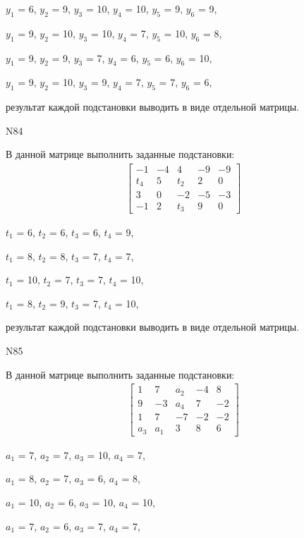 \documentclass[11pt]{report}
\begin{document}
$y_{1}$ = 6, $y_{2}$ = 9, $y_{3}$ = 10, $y_{4}$ = 10, $y_{5}$ = 9, $y_{6}$ = 9, 

$y_{1}$ = 9, $y_{2}$ = 10, $y_{3}$ = 10, $y_{4}$ = 7, $y_{5}$ = 10, $y_{6}$ = 8, 

$y_{1}$ = 9, $y_{2}$ = 9, $y_{3}$ = 7, $y_{4}$ = 6, $y_{5}$ = 6, $y_{6}$ = 10, 

$y_{1}$ = 9, $y_{2}$ = 10, $y_{3}$ = 9, $y_{4}$ = 7, $y_{5}$ = 7, $y_{6}$ = 6, 

результат каждой подстановки выводить в виде отдельной матрицы.

N84

В данной матрице выполнить заданные подстановки:
\begin{align*}
\left[\begin{matrix}-1 & -4 & 4 & -9 & -9\\t_{4} & 5 & t_{2} & 2 & 0\\3 & 0 & -2 & -5 & -3\\-1 & 2 & t_{3} & 9 & 0\end{matrix}\right]
\end{align*}


$t_{1}$ = 6, $t_{2}$ = 6, $t_{3}$ = 6, $t_{4}$ = 9, 

$t_{1}$ = 8, $t_{2}$ = 8, $t_{3}$ = 7, $t_{4}$ = 7, 

$t_{1}$ = 10, $t_{2}$ = 7, $t_{3}$ = 7, $t_{4}$ = 10, 

$t_{1}$ = 8, $t_{2}$ = 9, $t_{3}$ = 7, $t_{4}$ = 10, 

результат каждой подстановки выводить в виде отдельной матрицы.

N85

В данной матрице выполнить заданные подстановки:
\begin{align*}
\left[\begin{matrix}1 & 7 & a_{2} & -4 & 8\\9 & -3 & a_{4} & 7 & -2\\1 & 7 & -7 & -2 & -2\\a_{3} & a_{1} & 3 & 8 & 6\end{matrix}\right]
\end{align*}


$a_{1}$ = 7, $a_{2}$ = 7, $a_{3}$ = 10, $a_{4}$ = 7, 

$a_{1}$ = 8, $a_{2}$ = 7, $a_{3}$ = 6, $a_{4}$ = 8, 

$a_{1}$ = 10, $a_{2}$ = 6, $a_{3}$ = 10, $a_{4}$ = 10, 

$a_{1}$ = 7, $a_{2}$ = 6, $a_{3}$ = 7, $a_{4}$ = 7, 
\end{document}
